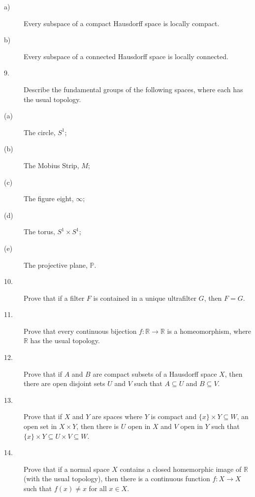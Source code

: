 \documentclass{article}
\def\R{{\mathbb R}}
\begin{document}
\begin{large}
\begin{description}
\item[\quad a)]
Every subspace of a compact Hausdorff space is locally compact.

\item[\quad b)]
Every subspace of a connected Hausdorff space is locally connected.

\item[9.]
Describe the fundamental groups of the following spaces, where each has the
usual topology.

\item[\quad (a)]
The circle, $S^1$;

\item[\quad (b)]
The Mobius Strip, $M$;

\item[\quad (c)]
The figure eight, $\infty$;

\item[\quad (d)]
The torus, $S^1 \times S^1$;

\item[\quad (e)]
The projective plane, ${\mathbb P}$.

\item[10.]
Prove that if a filter $F$ is contained in a unique ultrafilter $G$, then
$F=G$.

\item[11.]
Prove that every continuous bijection $f: {\R} \to {\R}$ is a
homeomorphism, where $\R$ has the usual topology.

\item[12.]
Prove that if $A$ and $B$ are compact subsets of a Hausdorff space $X$, then
there are open disjoint sets $U$ and $V$ such that $A \subseteq U$ and
$B \subseteq V$.

\item[13.]
Prove that if $X$ and $Y$ are spaces where $Y$ is compact and
$\{x\} \times Y \subseteq W$, an open set in $X \times Y$, then there is
$U$ open in $X$ and $V$ open in $Y$ such that
$\{x\} \times Y \subseteq U \times V \subseteq W$.

\item[14.]
Prove that if a normal space $X$ contains a closed homemorphic image of
$\R$ (with the usual topology), then there is a continuous function
$f :X \to X$ such that $f(x) \neq x$ for all $x \in X$.





    
\end{description}
\end{large} 
\end{document}
